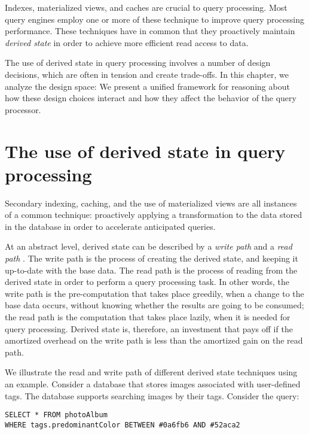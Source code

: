 Indexes, materialized views, and caches are crucial to query processing.
Most query engines employ one or more of these technique to improve query processing performance.
These techniques have in common that they proactively maintain \textit{derived state} in order to achieve more efficient read
access to data.

The use of derived state in query processing involves a number of design decisions,
which are often in tension and create trade-offs.
In this chapter, we analyze the design space:
We present a unified framework for reasoning about how these design choices interact
and how they affect the behavior of the query processor.


\section{The use of derived state in query processing}
\label{sec:read_write_path}

Secondary indexing, caching, and the use of materialized views are all instances of a common technique:
proactively applying a transformation to the data stored in the database in order to accelerate anticipated queries.

At an abstract level, derived state can be described by a \textit{write path} and a \textit{read path}
\cite{kleppmann:designing}.
The write path is the process of creating the derived state, and keeping it up-to-date with the base data.
The read path is the process of reading from the derived state in order to perform a query processing task.
In other words, the write path is the pre-computation that takes place greedily, when a change to the base data occurs,
without knowing whether the results are going to be consumed;
the read path is the computation that takes place lazily, when it is needed for query processing.
Derived state is, therefore, an investment that pays off if the amortized overhead on the write path is less than the amortized gain
on the read path.

We illustrate the read and write path of different derived state techniques using an example.
Consider a database that stores images associated with user-defined tags.
The database supports searching images by their tags.
Consider the query:

\begin{lstlisting}[]
SELECT * FROM photoAlbum
WHERE tags.predominantColor BETWEEN #0a6fb6 AND #52aca2
\end{lstlisting}

